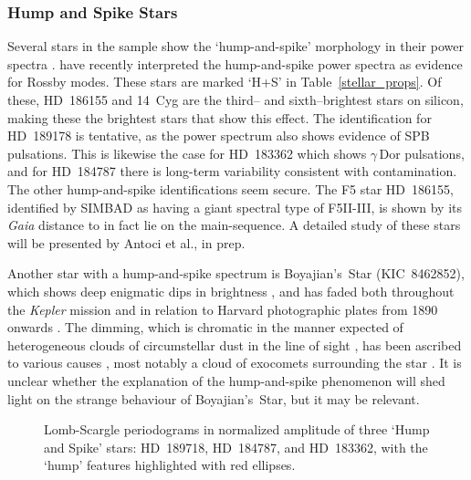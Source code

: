 \documentclass[modern]{aastex62}
\newcommand{\kepler}{\textit{Kepler}\xspace}
\newcommand{\gaia}{\textit{Gaia}\xspace}
\begin{document}
\subsubsection{Hump and Spike Stars}
\label{hs}

Several stars in the sample show the `hump-and-spike' morphology in their power spectra \citep[a broad `hump' of low-amplitude oscillations dominated by one high amplitude coherent oscillation toward the high frequency end of this band;][]{2013MNRAS.431.2240B,2014MNRAS.441.3543B,2017MNRAS.467.1830B}. \citet{2018MNRAS.474.2774S} have recently interpreted the hump-and-spike power spectra as evidence for Rossby modes.
These stars are marked `H+S' in Table~\ref{stellar_props}. Of these, HD~186155 and 14~Cyg are the third-- and sixth--brightest stars on silicon, making these the brightest stars that show this effect. The identification for HD~189178 is tentative, as the power spectrum also shows evidence of SPB pulsations. This is likewise the case for HD~183362 which shows $\gamma$\,Dor pulsations, and for HD~184787 there is long-term variability consistent with contamination. The other hump-and-spike identifications seem secure. The F5 star HD~186155, identified by SIMBAD as having a giant spectral type of F5II-III, is shown by its \gaia distance to in fact lie on the main-sequence. A detailed study of these stars will be presented by Antoci et al., in prep.

Another star with a hump-and-spike spectrum is Boyajian's~Star (KIC~8462852), which shows deep enigmatic dips in brightness \citep{2016MNRAS.457.3988B}, and has faded both throughout the \kepler mission \citep{2016ApJ...830L..39M} and in relation to Harvard photographic plates from 1890 onwards \citep{2016ApJ...822L..34S}. The dimming, which is chromatic in the manner expected of heterogeneous clouds of circumstellar dust in the line of sight \citep{2018ApJ...853..130D,2018arXiv180608842B}, has been ascribed to various causes \citep[reviewed in][]{2018RNAAS...2a..16W}, most notably a cloud of exocomets surrounding the star \citep[e.g.][]{2018MNRAS.473.5286W}. It is unclear whether the explanation of the hump-and-spike phenomenon will shed light on the strange behaviour of Boyajian's~Star, but it may be relevant.

\begin{figure}

\caption{\label{hs_fig}
Lomb-Scargle periodograms in normalized amplitude of three `Hump and Spike' stars: HD~189718, HD~184787, and HD~183362, with the `hump' features highlighted with red ellipses.}
\end{figure}
\end{document}
